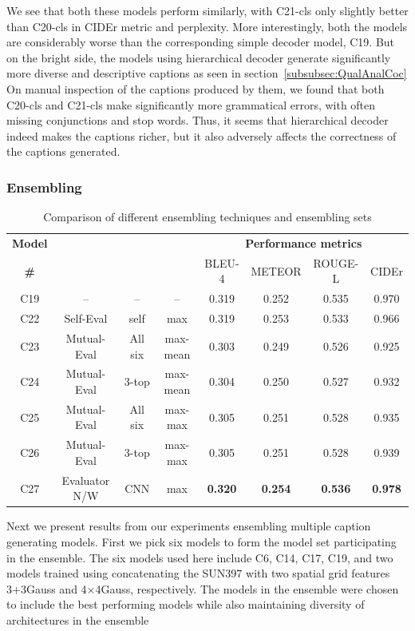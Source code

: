 We see that both these models perform similarly, with C21-cls only slightly
better than C20-cls in CIDEr metric and perplexity.
More interestingly, both the models are considerably worse than the
corresponding simple decoder model, C19.
But on the bright side, the models using hierarchical decoder generate
significantly more diverse and descriptive captions as seen in
section~\ref{subsubsec:QualAnalCoc}
On manual inspection of the captions produced by them, we found that both
C20-cls and C21-cls make significantly more grammatical errors, with often
missing conjunctions and stop words.
Thus, it seems that hierarchical decoder indeed makes the captions richer, but
it also adversely affects the correctness of the captions generated.

\subsubsection{Ensembling}
\begin{table}[htp]
  \centering
  \newcommand{\bs}{\small}
  \begin{adjustbox}{center}
  \begin{tabular}{|c|c|c|c|c|c|c|c|}
    \hline
    \bf Model & \bf \multirow{2}{*}{Method} & \bf \multirow{2}{*}{Evaluators}&
    \bf \multirow{2}{*}{Eval type}  & \multicolumn{4}{c|}{\bf Performance metrics}\\
    \cline{5-8}
    \bf \# & & & &\bs BLEU-4 &\bs METEOR &\bs ROUGE-L &\bs CIDEr\\\hline
    C19 & --    & -- & -- & 0.319 & 0.252 & 0.535 & 0.970\\\hline
    C22 & Self-Eval & self      & max      & 0.319 & 0.253 & 0.533 & 0.966\\\hline
    C23 & Mutual-Eval      &  All six  & max-mean & 0.303 & 0.249 & 0.526 & 0.925\\
    C24 & Mutual-Eval      &  3-top    & max-mean & 0.304 & 0.250 & 0.527 &
    0.932\\\cline{3-8}
    C25 & Mutual-Eval      &  All six  & max-max  & 0.305 & 0.251 & 0.528 & 0.935\\
    C26 & Mutual-Eval      &  3-top    & max-max  & 0.305 & 0.251 & 0.528 & 0.939\\\hline
    C27 & Evaluator N/W & CNN  & max&\bf0.320&\bf0.254 &\bf0.536 &\bf0.978\\\hline
  \end{tabular}
  \end{adjustbox}
  \caption{Comparison of different ensembling techniques and ensembling sets}
  \label{tab:resEnsembCocValset}
\end{table}
Next we present results from our experiments ensembling multiple caption
generating models.
First we pick six models to form the model set participating in the ensemble.
The six models used here include C6, C14, C17, C19, and two models trained
using concatenating the SUN397 with two spatial grid features 3+3Gauss and
4$\times$4Gauss, respectively.
The models in the ensemble were chosen to include the best performing models
while also maintaining diversity of architectures in the ensemble


